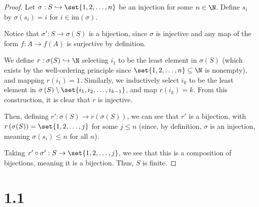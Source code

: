 \documentclass[10pt]{mypackage}
\begin{document}
\begin{proof}
  Let $\sigma: S\hookrightarrow \set{1,2,\dots,n}$ be an injection for some $n\in \N$. Define $s_i$ by $\sigma\left(s_i\right) = i$ for $i\in \text{im}\left(\sigma\right)$.\newline

  Notice that $\sigma': S\rightarrow \sigma(S)$ is a bijection, since $\sigma$ is injective and any map of the form $f: A\rightarrow f(A)$ is surjective by definition.\newline

  We define $r: \sigma(S) \hookrightarrow \N$ selecting $i_1$ to be the least element in $\sigma(S)$ (which exists by the well-ordering principle since $\set{1,2,\dots,n}\subseteq \N$ is nonempty), and mapping $r\left(i_1\right)= 1$. Similarly, we inductively select $i_k$ to be the least element in $\sigma\left(S\right) \setminus \set{i_1,i_2,\dots,i_{k-1}}$, and map $r\left(i_k\right) = k$. From this construction, it is clear that $r$ is injective.\newline

  Then, defining $r': \sigma\left(S\right)\rightarrow r\left(\sigma(S)\right)$, we can see that $r'$ is a bijection, with $r\left(\sigma(S)\right) = \set{1,2,\dots,j}$ for some $j\leq n$ (since, by definition, $\sigma$ is an injection, meaning $\sigma\left(s_i\right) \leq n$ for all $n$).\newline

  Taking $r'\circ \sigma': S\rightarrow \set{1,2,\dots,j}$, we see that this is a composition of bijections, meaning it is a bijection. Thus, $S$ is finite.
\end{proof}
%
\section{1.1}%
\end{document}
